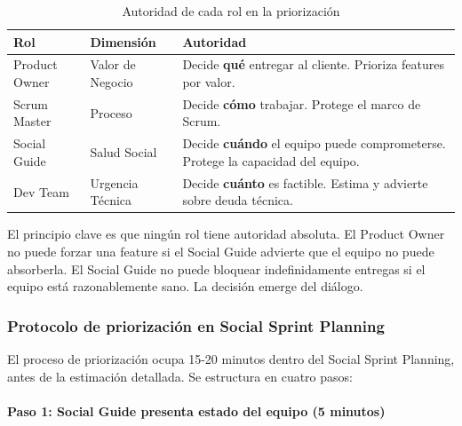\begin{table}[h]
    \centering
    \small
    \begin{tabularx}{\textwidth}{|l|l|X|}
        \hline
        \textbf{Rol}  & \textbf{Dimensión}                                                                     & \textbf{Autoridad} \\
        \hline
        Product Owner & Valor de Negocio
                      & Decide \textbf{qué} entregar al cliente. Prioriza features por valor.                                       \\
        \hline
        Scrum Master  & Proceso
                      & Decide \textbf{cómo} trabajar. Protege el marco de Scrum.                                                   \\
        \hline
        Social Guide  & Salud Social
                      & Decide \textbf{cuándo} el equipo puede comprometerse. Protege la capacidad del equipo.                      \\
        \hline
        Dev Team      & Urgencia Técnica
                      & Decide \textbf{cuánto} es factible. Estima y advierte sobre deuda técnica.                                  \\
        \hline
    \end{tabularx}
    \caption{Autoridad de cada rol en la priorización}
    \label{tab:autoridad-roles}
\end{table}
\FloatBarrier

El principio clave es que ningún rol tiene autoridad absoluta. El Product Owner no puede forzar una feature si el Social Guide advierte que el equipo no puede absorberla. El Social Guide no puede bloquear indefinidamente entregas si el equipo está razonablemente sano. La decisión emerge del diálogo.

\subsubsection{Protocolo de priorización en Social Sprint Planning}

El proceso de priorización ocupa 15-20 minutos dentro del Social Sprint Planning, antes de la estimación detallada. Se estructura en cuatro pasos:

\paragraph{Paso 1: Social Guide presenta estado del equipo (5 minutos)}

